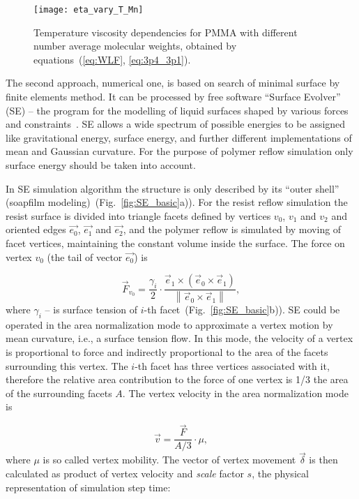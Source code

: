 \begin{figure}
	\begin{center}
		\texttt{[image: eta\_vary\_T\_Mn]}
	\end{center}
	\vspace{-2em}
	\caption{Temperature viscosity dependencies for PMMA with different number average molecular weights, obtained by equations~(\ref{eq:WLF}, \ref{eq:3p4_3p1}).}
	\label{fig:eta_vary_T_Mn}
\end{figure}

The second approach, numerical one, is based on search of minimal surface by finite elements method. It can be processed by free software ``Surface Evolver'' (SE) -- the program for the modelling of liquid surfaces shaped by various forces and constraints~\cite{Brakke_SE}. SE allows a wide spectrum of possible energies to be assigned like gravitational energy, surface energy, and further different implementations of mean and Gaussian curvature. For the purpose of polymer reflow simulation only surface energy should be taken into account.

In SE simulation algorithm the structure is only described by its ``outer shell'' (soapfilm modeling)~(Fig.~\ref{fig:SE_basic}a)). For the resist reflow simulation the resist surface is divided into triangle facets defined by vertices $v_0$, $v_1$ and $v_2$ and oriented edges $\vec{e_0}$, $\vec{e_1}$ and $\vec{e_2}$, and the polymer reflow is simulated by moving of facet vertices, maintaining the constant volume inside the surface. The force on vertex $v_0$ (the tail of vector $\vec{e_0}$) is

\begin{equation}
	\vec{F}_{v_0}=\frac{\gamma_i}{2} \cdot \frac{\vec{e}_1 \times\left(\vec{e}_0 \times \vec{e}_1\right)}{\left\|\vec{e}_0 \times \vec{e}_1\right\|},
\end{equation}
where $\gamma_i$ -- is surface tension of $i$-th facet~(Fig.~\ref{fig:SE_basic}b)). SE could be operated in the area normalization mode to approximate a vertex motion by mean curvature, i.e., a surface tension flow. In this mode, the velocity of a vertex is proportional to force and indirectly proportional to the area of the facets surrounding this vertex. The $i$-th facet has three vertices associated with it, therefore the relative area contribution to the force of one vertex is 1/3 the area of the surrounding facets $A$. The vertex velocity in the area normalization mode is

\begin{equation}
	\vec{v} = \frac{\vec{F}}{A/3} \cdot \mu,
\end{equation}
where $\mu$ is so called vertex mobility. The vector of vertex movement $\vec{\delta}$ is then calculated as product of vertex velocity and \textit{scale} factor $s$, the physical representation of simulation step time:

